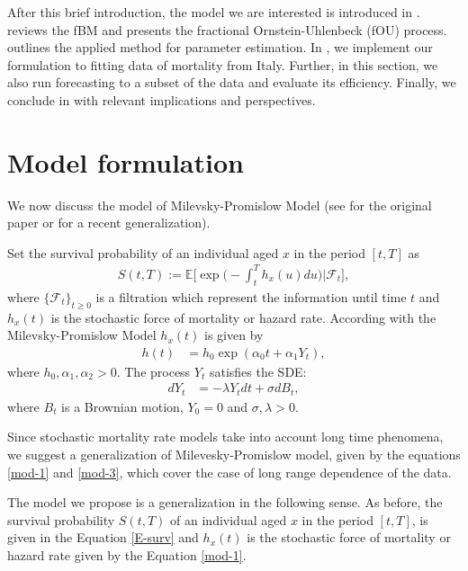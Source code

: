 \documentclass[smallextended]{svjour3}
\newcommand{\E}{\mathbb{E}}
\begin{document}


        After this brief introduction, the model we are interested is introduced in .  
    reviews the fBM and presents
    the fractional Ornstein-Uhlenbeck (fOU) process.  outlines the
    applied method for parameter estimation. In  , we implement our
    formulation to fitting data of mortality from Italy. Further, in
    this section, we also run forecasting to a subset of the data and evaluate
    its efficiency. Finally, we conclude in  with relevant
    implications and perspectives.

\section{Model formulation}\label{model-form}


We now discuss the model of Milevsky-Promislow Model 
(see \cite{mi-pr} for the original paper
or \cite{gi-or-be}
for a recent generalization). 

Set the survival probability of an individual aged $x$ in the period $[t,T]$ as
\begin{align}\label{E-surv}
 S(t,T):=\E\Big[\exp\Big(-\int_t^T h_x(u) du\Big)\Big|\mathcal{F}_t \Big],
\end{align}
where $\{\mathcal{F}_t\}_{t\ge 0} $ is a filtration which represent the information until time $t$ and $h_x(t)$ is the
stochastic force of mortality or hazard rate. According with the Milevsky-Promislow Model $h_x(t)$ is given by
\begin{align}
 h(t)&=h_0\exp(\alpha_0t+\alpha_1Y_t),\label{mod-1}
\end{align}
where  $h_0,\alpha_1,\alpha_2> 0$. The process $Y_t$ satisfies the SDE:
\begin{align}
 dY_t&=-\lambda Y_tdt+\sigma dB_t, \label{mod-3}
\end{align}
where $B_t$ is a Brownian motion, $Y_0=0$ and $\sigma,\lambda> 0$.


Since stochastic mortality rate models take into account long time phenomena, we
suggest a generalization of Milevesky-Promislow model, given by the equations
\eqref{mod-1} and \eqref{mod-3}, which cover the case of long range dependence of
the data.


The model we propose is a generalization in the following sense.
As before, the survival probability $S(t,T)$ of an individual aged
$x$ in the period $[t,T]$, is given in the Equation \eqref{E-surv}
and $h_x(t)$ is the stochastic force of mortality or hazard rate given by the
Equation \eqref{mod-1}.
\end{document}
